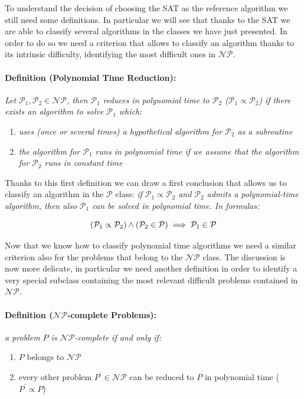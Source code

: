 \documentclass[english]{article}
\begin{document}
			To understand the decision of choosing the SAT as the reference algorithm we still need some definitions. In particular we will see that thanks to the SAT we are able to classify several algorithms in the classes we have just presented. In order to do so we need a criterion that allows to classify an algorithm thanks to its intrinsic difficulty, identifying the most difficult ones in $\mathcal{N}\mathcal{P}$.
			
			\paragraph{Definition (Polynomial Time Reduction):} \emph{Let $\mathcal{P}_1, \mathcal{P}_2 \in \mathcal{N}\mathcal{P}$, then $\mathcal{P}_1$ reduces in polynomial time to $\mathcal{P}_2$ ($\mathcal{P}_1 \propto \mathcal{P}_2$) if there exists an algorithm to solve $\mathcal{P}_1$ which:}
			\begin{enumerate}[label=(\roman*)]
				\item \emph{uses (once or several times) a hypothetical algorithm for $\mathcal{P}_2$ as a subroutine}
				
				\item \emph{the algorithm for $\mathcal{P}_1$ runs in polynomial time if we assume that the algorithm for $\mathcal{P}_2$ runs in constant time}
			\end{enumerate}
		
			Thanks to this first definition we can draw a first conclusion that allows us to classify an algorithm in the $\mathcal{P}$ class: \emph{if $\mathcal{P}_1\propto\mathcal{P}_2$ and $\mathcal{P}_2$ admits a polynomial-time algorithm, then also $\mathcal{P}_1$ can be solved in polynomial time. In formulas:}
			
			\begin{equation*}
				\centering
				(\mathcal{P}_1\propto\mathcal{P}_2) \land (\mathcal{P}_2 \in \mathcal{P}) \implies \mathcal{P}_1 \in \mathcal{P}
			\end{equation*}
		
			Now that we know how to classify polynomial time algorithms we need a similar criterion also for the problems that belong to the $\mathcal{N}\mathcal{P}$ class. The discussion is now more delicate, in particular we need another definition in order to identify a very special subclass containing the most relevant difficult problems contained in $\mathcal{N}\mathcal{P}$.
			
			\paragraph{Definition ($\mathcal{N}\mathcal{P}$-complete Problems):} \emph{a problem $P$ is $\mathcal{N}\mathcal{P}$-complete if and only if:}
			\begin{enumerate}[label=(\roman*)]
				\item $P$ belongs to $\mathcal{N}\mathcal{P}$
				
				\item every other problem $P^{'}\in\mathcal{N}\mathcal{P}$ can be reduced to $P$ in polynomial time ($P^{'}\propto P$)
			\end{enumerate}
			 
\end{document}
